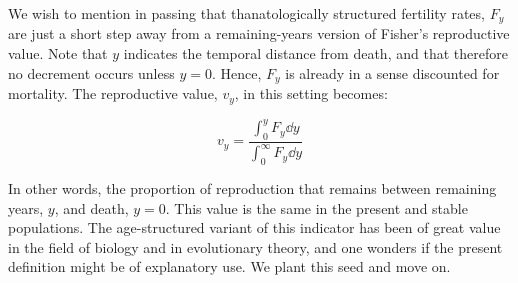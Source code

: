 
We wish to mention in passing that thanatologically structured fertility rates,
$F_y$ are just a short step away from a remaining-years version of Fisher's
\citep{fisher1999genetical} reproductive value. Note that $y$ indicates the
temporal distance from death, and that therefore no decrement occurs 
unless $y=0$. Hence, $F_y$ is already in a sense discounted for mortality. The
reproductive value, $v_y$, in this setting becomes:

\begin{equation}
\label{eq:eyfisher}
v_y = \frac{\int _0 ^y F_y \dd y}{\int _0 ^\infty F_y \dd y} 
\end{equation}

In other words, the proportion of reproduction that remains between
remaining years, $y$, and death, $y=0$. This value is the same in the present
and stable populations. The age-structured variant of this indicator has been of
great value in the field of biology and in evolutionary theory, and one wonders
if the present definition might be of explanatory use. We plant this seed and
move on.
